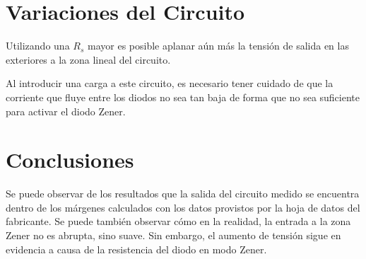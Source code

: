 \section{Variaciones del Circuito}

Utilizando una $R_s$ mayor es posible aplanar aún más la tensión de salida en las exteriores a la zona lineal del circuito.

Al introducir una carga a este circuito, es necesario tener cuidado de que la corriente que fluye entre los diodos no sea tan baja de forma que no sea suficiente para activar el diodo Zener.

\section{Conclusiones}
Se puede observar de los resultados que la salida del circuito medido se encuentra dentro de los márgenes calculados con los datos provistos por la hoja de datos del fabricante. Se puede también observar cómo en la realidad, la entrada a la zona Zener no es abrupta, sino suave. Sin embargo, el aumento de tensión sigue en evidencia a causa de la resistencia del diodo en modo Zener.